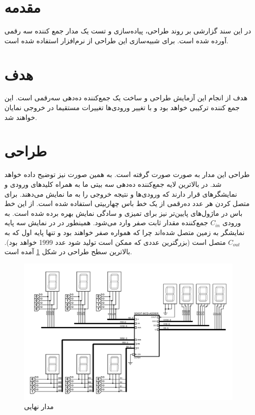 \documentclass{article}
\begin{document}
\section{مقدمه}
در این سند گزارشی بر روند طراحی، پیاده‌سازی و تست یک مدار جمع کننده  سه رقمی آورده ‌شده است. برای شبیه‌سازی این طراحی از نرم‌افزار  استفاده شده است.

\section{هدف}
هدف از انجام این آزمایش طراحی و ساخت یک جمع‌کننده ده‌دهی سه‌رقمی است. این جمع کننده ترکیبی خواهد بود و با تغییر ورودی‌ها تغییرات مستقیما در خروجی نمایان خواهند شد.

\section{طراحی}
طراحی این مدار به صورت  صورت گرفته است. به همین‌ صورت نیز توضیح داده خواهد شد. در بالاترین لایه جمع‌کننده ده‌دهی سه بیتی ما به همراه کلید‌های ورودی و نمایشگر‌های  قرار دارند که ورودی‌ها و نتیجه خروجی‌ را به ما نمایش می‌دهند. برای متصل کردن هر عدد ده‌رقمی از یک خط باس چهاربیتی استفاده شده است. از این خط باس در ماژول‌های پایین‌تر نیز برای تمیزی و سادگی نمایش بهره‌ برده شده است.
به ورودی
$ C_{in} $
 جمع‌کننده مقدار ثابت صفر وارد می‌شود. همینطور در در نمایش سه پایه نمایشگر به زمین متصل شده‌اند چرا که همواره صفر خواهند بود و تنها پایه اول که به
$C_{out}$
  متصل است (بزرگترین عددی که ممکن است تولید شود عدد 1999 خواهد بود). بالاترین سطح طراحی در شکل \ref{fig:final} آمده است.

\begin{figure}
	\centering
	\includegraphics[scale=0.5]{./captures/final}
	\caption{مدار نهایی}
	\label{fig:final}
\end{figure}
\end{document}
